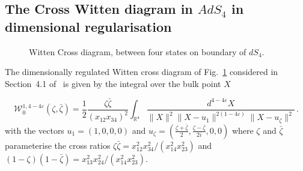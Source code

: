 \documentclass[a4paper,12pt]{article}
\numberwithin{equation}{section}
\numberwithin{figure}{section}
\begin{document}
\subsection{The Cross Witten diagram in $AdS_4$ in dimensional regularisation}\label{sec:WittenCross}
 \begin{figure}[ht]
                \centering
                \caption{Witten Cross diagram, between four states on
                  boundary of $dS_4$. }
                \label{fig:cross}
        \end{figure}


The dimensionally regulated Witten cross diagram of Fig.~\ref{fig:cross} considered in
Section~4.1 of~\cite{Heckelbacher:2022fbx} is given by the integral
over the bulk point $X$

\begin{equation}
       \mathcal{ W}_0^{1,4-4\varepsilon}(\zeta,\bar\zeta)=\frac12\frac{\zeta\bar\zeta}{(x_{12}x_{34})^2}\int_{\mathbb{R}^4}\frac{d^{4-4\varepsilon}X}{\|X\|^2\|X-u_1\|^{2(1-4\varepsilon)}\|X-u_{\zeta}\|^2}\,.
\end{equation}
with the vectors  $u_1=(1,0,0,0)$ and 
$u_{\zeta}=\left(\frac{\zeta+\bar\zeta}{2},\frac{\zeta-\bar\zeta}{2i},0,0\right)$ where $\zeta$  and $\bar\zeta$ parameterise the cross ratios $\zeta\bar\zeta=x_{12}^2x_{34}^2/(x_{14}^2x_{23}^2)$ and
  $(1-\zeta)(1-\bar\zeta)=x_{13}^2x_{24}^2 /(x_{14}^2 x_{23}^2)$.
\end{document}

